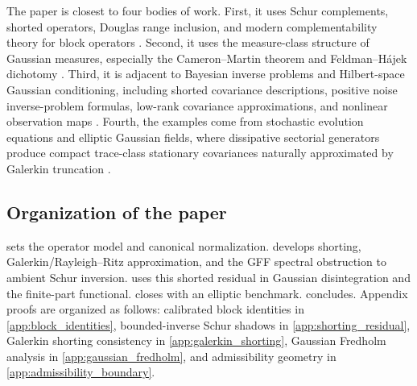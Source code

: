 \documentclass[preprint,12pt]{elsarticle}
\theoremstyle{plain}
\theoremstyle{definition}
\theoremstyle{remark}
\begin{document}
    The paper is closest to four bodies of work.  First, it uses Schur
    complements, shorted operators, Douglas range inclusion, and modern
    complementability theory for block operators
    \cite{krein1947selfadjoint,anderson1975shorted,douglas1966majorization,tretter2008spectral,contino2018schur,friedrich2017generalized,contino2021matrix,naikjohnson2024complementable}.
    Second, it uses the measure-class structure of Gaussian measures,
    especially the Ca\-me\-ron--Mar\-tin theorem and Feld\-man--H\'{a}\-jek dichotomy
    \cite{feldman1958equivalence,hajek1958property,bogachev1998gaussian}.
    Third, it is adjacent to Bayesian inverse problems and Hilbert-space
    Gaussian conditioning, including shorted covariance descriptions, positive
    noise inverse-problem formulas, low-rank covariance approximations, and nonlinear
    observation maps
    \cite{owhadi2015conditioning,stuart2010inverse,steinwart2024conditioning,chen2024gaussian,carerelie2024covariance,carerelie2025mean,quang2022kl}.
    Fourth, the examples come from stochastic evolution equations and elliptic
    Gaussian fields, where dissipative sectorial generators produce compact
    trace-class stationary covariances naturally approximated by Galerkin
    truncation \cite{daprato2014stochastic,lord2014introduction,simon2005trace,henderson2022sobolev,jorgensentian2024hilbert}.

    \subsection{Organization of the paper}
    \label{sec:organization}

     sets the operator model and canonical normalization.
     develops shorting, Galerkin/Rayleigh--Ritz approximation,
    and the GFF spectral obstruction to ambient Schur inversion.
     uses this shorted residual in Gaussian
    disintegration and the finite-part functional.  closes with an
    elliptic benchmark.  concludes. Appendix proofs are organized as follows:
    calibrated block identities in \ref{app:block_identities},
    bounded-inverse Schur shadows in \ref{app:shorting_residual},
    Galerkin shorting consistency in \ref{app:galerkin_shorting},
    Gaussian Fredholm analysis in \ref{app:gaussian_fredholm},
    and admissibility geometry in \ref{app:admissibility_boundary}.

\end{document}
